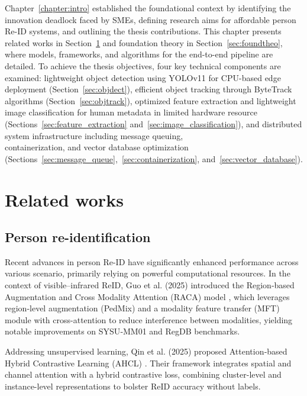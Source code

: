 \documentclass[../main.tex]{subfiles}
\begin{document}
Chapter~\ref{chapter:intro} established the foundational context by identifying the innovation deadlock faced by SMEs, defining research aims for affordable person Re-ID systems, and outlining the thesis contributions. This chapter presents related works in Section~\ref{sec:related} and foundation theory in Section~\ref{sec:foundtheo}, where models, frameworks, and algorithms for the end-to-end pipeline are detailed. To achieve the thesis objectives, four key technical components are examined: lightweight object detection using YOLOv11 for CPU-based edge deployment (Section~\ref{sec:objdect}), efficient object tracking through ByteTrack algorithms (Section~\ref{sec:objtrack}), optimized feature extraction and lightweight image classification for human metadata in limited hardware resource (Sections~\ref{sec:feature_extraction} and~\ref{sec:image_classification}), and distributed system infrastructure including message queuing,\\ containerization, and vector database optimization (Sections~\ref{sec:message_queue},~\ref{sec:containerization}, and~\ref{sec:vector_database}).

\section{Related works}
\label{sec:related}

\subsection{Person re-identification}
\label{sec:personreid}

Recent advances in person Re-ID have significantly enhanced performance across various scenario, primarily relying on powerful computational resources. In the context of visible–infrared ReID, Guo et al. (2025) introduced the Region‑based Augmentation and Cross Modality Attention (RACA) model \cite{visible-infrared-reid}, which leverages region-level augmentation (PedMix) and a modality feature transfer (MFT) module with cross-attention to reduce interference between modalities, yielding notable improvements on SYSU‑MM01 and RegDB benchmarks.

Addressing unsupervised learning, Qin et al. (2025) proposed Attention‑based Hybrid Contrastive Learning (AHCL) \cite{unsupervised-reid}. Their framework integrates spatial and channel attention with a hybrid contrastive loss, combining cluster-level and instance-level representations to bolster ReID accuracy without labels.
 
\end{document}
